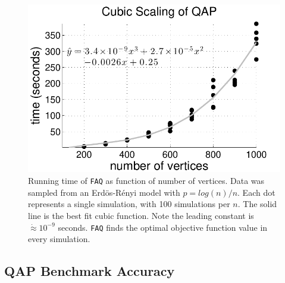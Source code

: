 \documentclass[11pt]{article}
\newcommand{\FAQ}{\texttt{FAQ} }
\begin{document}
\begin{figure}[htbp]
	\centering			
	\includegraphics[width=0.5\linewidth]{ErdosRenyi_results.pdf}
	\caption{Running time of \FAQ as function of number of vertices. Data was sampled from an Erd\"os-R\'enyi model with $p=log(n)/n$.  Each dot represents a single simulation, with 100 simulations per $n$.  The solid line is the best fit cubic function.  Note the leading constant is $\dot{\approx} 10^{-9}$ seconds. \FAQ finds the optimal objective function value in every simulation.}
	\label{fig:scaling}
\end{figure}


\subsection{QAP Benchmark Accuracy} %
\label{sub:qap_benchmarks}
\end{document}
